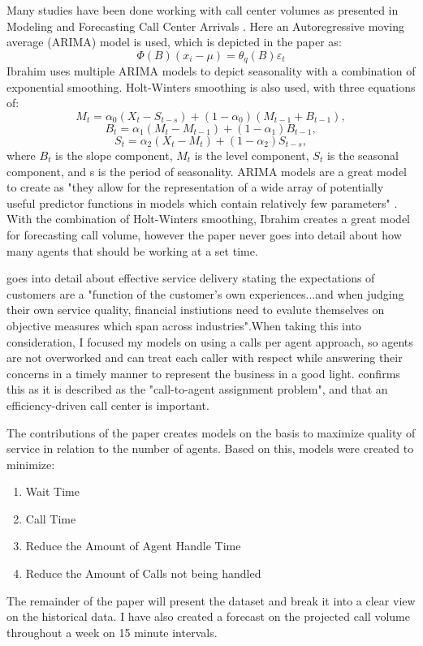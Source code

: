 \documentclass[12pt]{article}
\begin{document}
  Many studies have been done working with call center volumes as presented in Modeling and Forecasting Call Center Arrivals \citep{ibrahim2016modeling}.
Here an Autoregressive moving average (ARIMA) model is used, which is depicted in the paper as:
\begin{equation}
  \label{eq:ARIMA Standard}
  \Phi(B)(x_i -\mu)=\theta_q(B)\varepsilon_t
\end{equation}
Ibrahim uses multiple ARIMA models to depict seasonality with a combination of exponential smoothing. Holt-Winters smoothing is also used,
with three equations of:
\begin{equation}
  \label{eq:Holt-Winters}
  M_t=\alpha_0(X_t-S_{t-s}) + (1-\alpha_0)(M_{t-1}+B_{t-1}),
\end{equation}
\begin{equation}
  \label{eq:Holt-Winters2}
  B_t=\alpha_1(M_t-M_{t-1}) +(1-\alpha_1)B_{t-1},
\end{equation}
\begin{equation}
  \label{eq:Holt-Winters3}
  S_t=\alpha_2(X_t-M_t) +(1-\alpha_2)S_{t-s},
\end{equation}
where $B_{t}$ is the slope component, $M_{t}$ is the level component, $S_{t}$ is the seasonal component, and s is the period of seasonality.
ARIMA models are a great model to create as "they allow for the representation of a  wide array of potentially useful predictor functions in  models  which contain relatively few parameters" \citep{newbold1983arima}.
With the combination of Holt-Winters smoothing, Ibrahim creates a great model for forecasting call volume, however the paper never goes into detail about
how many agents that should be working at a set time. 

  \citep{evensen1999effective} goes into detail about effective service delivery stating the expectations of customers are a "function of
the customer's own experiences...and when judging their own service quality, financial instiutions need to evalute themselves on 
objective measures which span across industries".When taking this into consideration, I focused my models on using a calls per agent approach,
so agents are not overworked and can treat each caller with respect while answering their concerns in a timely manner to represent the business in a good light. \citep{avramidis2005modeling} confirms
this as it is described as the "call-to-agent assignment problem", and that an efficiency-driven call center is important.


  The contributions of the paper creates models on the basis to maximize quality of service in relation to the number of agents. 
Based on this, models were created to minimize:
\begin{enumerate}
  \item Wait Time
  \item Call Time
  \item Reduce the Amount of Agent Handle Time
  \item Reduce the Amount of Calls not being handled
\end{enumerate}
The remainder of the paper will present the dataset and break it into a clear view on the historical data. I have also created a 
forecast on the projected call volume throughout a week on 15 minute intervals.
\end{document}
